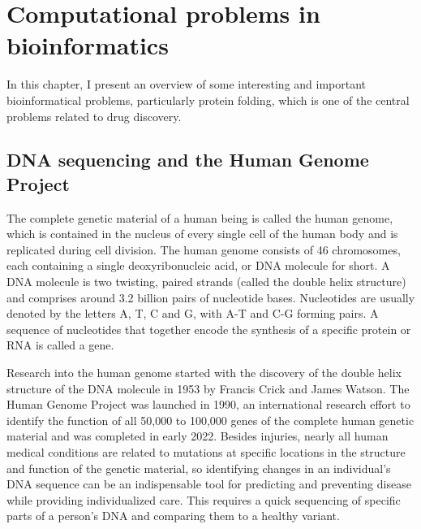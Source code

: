 \chapter{Computational problems in bioinformatics}

In this chapter, I present an overview of some interesting and important bioinformatical problems, particularly protein folding, which is one of the central problems related to drug discovery\cite{BockenhauerAlgoBioinfo}.

\section{DNA sequencing and the Human Genome Project}

The complete genetic material of a human being is called the human genome, which is contained in the nucleus of every single cell of the human body and is replicated during cell division. The human genome consists of 46 chromosomes, each containing a single deoxyribonucleic acid, or DNA molecule for short. A DNA molecule is two twisting, paired strands (called the double helix structure) and comprises around 3.2 billion pairs of nucleotide bases. Nucleotides are usually denoted by the letters A, T, C and G, with A-T and C-G forming pairs. A sequence of nucleotides that together encode the synthesis of a specific protein or RNA is called a gene.

Research into the human genome started with the discovery of the double helix structure of the DNA molecule in 1953 by Francis Crick and James Watson. The Human Genome Project\cite{CollinsHumanGenome1995} was launched in 1990, an international research effort to identify the function of all 50,000 to 100,000 genes of the complete human genetic material and was completed in early 2022\cite{zahn_filling_2022}. Besides injuries, nearly all human medical conditions are related to mutations at specific locations in the structure and function of the genetic material\cite{CollinsHumanGenome1995}, so identifying changes in an individual's DNA sequence can be an indispensable tool for predicting and preventing disease while providing individualized care. This requires a quick sequencing of specific parts of a person's DNA and comparing them to a healthy variant.

